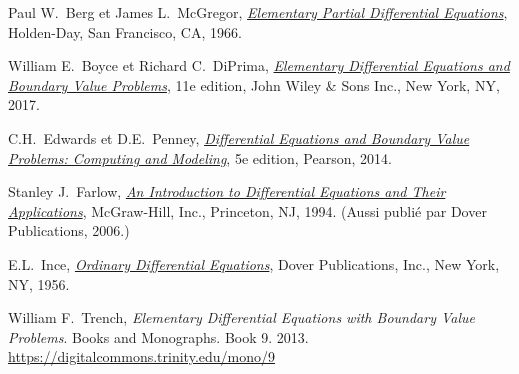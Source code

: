 \documentclass[12pt]{book}
\begin{document}
\begin{thebibliography}{MM}


\label{furtherreading:chapter}

 Paul W.\ Berg et James L.\ McGregor,
 \emph{\href{https://books.google.com/books?id=EfJQAAAAMAAJ}{Elementary
Partial Differential Equations}},
 Holden-Day,
 San Francisco, CA\@,
 1966.

 William E.\ Boyce et
 Richard C.\ DiPrima,
 \emph{\href{https://books.google.com/books?id=nYWcQgAACAAJ}{Elementary
Differential Equations and Boundary Value Problems}},
 11e edition,
 John Wiley \& Sons Inc.,
 New York, NY\@, 2017.

 C.H.\ Edwards et D.E.\ Penney,
 \emph{\href{https://books.google.com/books?id=wuWvoAEACAAJ}{Differential
Equations and Boundary Value Problems: Computing and Modeling}},
 5e edition,
 Pearson,
 2014.

 Stanley J.\ Farlow,
 \emph{\href{https://books.google.com/books?id=_ozWAAAAMAAJ}{An Introduction
to Differential Equations and Their Applications}},
 McGraw-Hill, Inc.,
 Princeton, NJ\@,
 1994.  (Aussi publié par Dover Publications, 2006.)

 E.L.\ Ince,
 \emph{\href{https://books.google.com/books?id=uYz-pqUD75gC}{Ordinary
Differential Equations}},
 Dover Publications, Inc.,
 New York, NY\@,
 1956.

 William F.\ Trench,
 \emph{Elementary Differential Equations with Boundary Value
Problems}. Books and Monographs. Book 9.  2013.
\url{https://digitalcommons.trinity.edu/mono/9}

\end{thebibliography}
\end{document}
